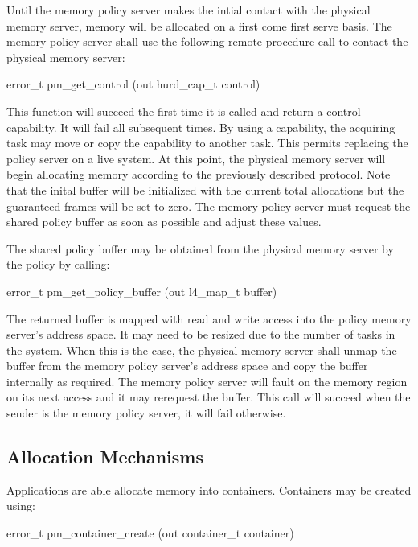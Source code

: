 Until the memory policy server makes the intial contact with the
physical memory server, memory will be allocated on a first come first
serve basis.  The memory policy server shall use the following remote
procedure call to contact the physical memory server:

\begin{code}
error\_t pm\_get\_control (out hurd\_cap\_t control)
\end{code}

\noindent
This function will succeed the first time it is called and return a
control capability.  It will fail all subsequent times.  By using a
capability, the acquiring task may move or copy the capability to
another task.  This permits replacing the policy server on a live
system.  At this point, the physical memory server will begin
allocating memory according to the previously described protocol.
Note that the inital buffer will be initialized with the current total
allocations but the guaranteed frames will be set to zero.  The memory
policy server must request the shared policy buffer as soon as
possible and adjust these values.

The shared policy buffer may be obtained from the physical memory
server by the policy by calling:

\begin{code}
error\_t pm\_get\_policy\_buffer (out l4\_map\_t buffer)
\end{code}

\noindent
The returned buffer is mapped with read and write access into the
policy memory server's address space.  It may need to be resized due
to the number of tasks in the system.  When this is the case, the
physical memory server shall unmap the buffer from the memory policy
server's address space and copy the buffer internally as required.
The memory policy server will fault on the memory region on its next
access and it may rerequest the buffer.  This call will succeed when
the sender is the memory policy server, it will fail otherwise.

\subsection{Allocation Mechanisms}

Applications are able allocate memory into containers.  Containers may
be created using:

\begin{code}
error\_t pm\_container\_create (out container\_t container)
\end{code}

